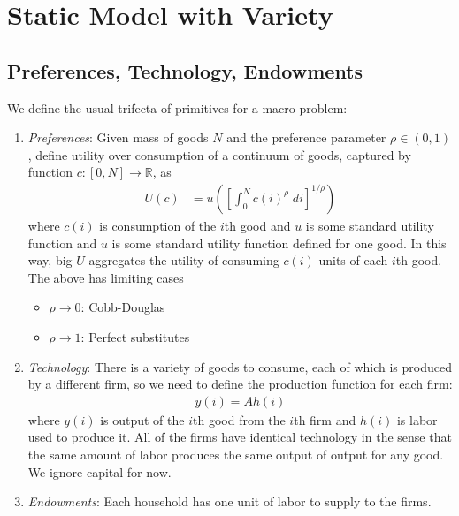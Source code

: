 \documentclass[12pt]{article}
\theoremstyle{plain}
\theoremstyle{definition}
\theoremstyle{remark}
\newcommand{\ra}{\rightarrow}
\newcommand{\R}{\mathbb{R}}
\begin{document}
\clearpage
\section{Static Model with Variety}

\subsection{Preferences, Technology, Endowments}

We define the usual trifecta of primitives for a macro problem:
\begin{enumerate}
  \item \emph{Preferences}:
    Given mass of goods $N$ and the preference parameter $\rho\in(0,1)$,
    define utility over consumption of a continuum of goods, captured by
    function $c:[0,N]\ra \R$, as
    \begin{align*}
      U(c) &=
      u\left(
      \left[
      \int_0^N c(i)^\rho \; di
      \right]^{1/\rho}
      \right)
    \end{align*}
    where $c(i)$ is consumption of the $i$th good and $u$ is some
    standard utility function and $u$ is some standard utility function
    defined for one good. In this way, big $U$ aggregates the utility of
    consuming $c(i)$ units of each $i$th good.  The above has limiting
    cases
    \begin{itemize}
      \item $\rho\ra 0$: Cobb-Douglas
      \item $\rho\ra 1$: Perfect substitutes
    \end{itemize}

  \item \emph{Technology}:
    There is a variety of goods to consume, each of which is produced by
    a different firm, so we need to define the production function for
    each firm:
    \begin{align*}
      y(i) = A h(i)
    \end{align*}
    where $y(i)$ is output of the $i$th good from the $i$th firm and
    $h(i)$ is labor used to produce it. All of the firms have identical
    technology in the sense that the same amount of labor produces the
    same output of output for any good. We ignore capital for now.

  \item \emph{Endowments}: Each household has one unit of labor to
    supply to the firms.
\end{enumerate}
\end{document}
